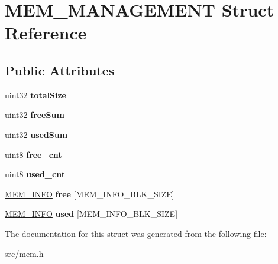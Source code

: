 \hypertarget{struct_m_e_m___m_a_n_a_g_e_m_e_n_t}{}\section{M\+E\+M\+\_\+\+M\+A\+N\+A\+G\+E\+M\+E\+N\+T Struct Reference}
\label{struct_m_e_m___m_a_n_a_g_e_m_e_n_t}
\subsection*{Public Attributes}
\begin{DoxyCompactItemize}
\item 
\hypertarget{struct_m_e_m___m_a_n_a_g_e_m_e_n_t_a66ec16527e43ed4673d4e2b013f88df4}{}uint32 {\bfseries total\+Size}\label{struct_m_e_m___m_a_n_a_g_e_m_e_n_t_a66ec16527e43ed4673d4e2b013f88df4}

\item 
\hypertarget{struct_m_e_m___m_a_n_a_g_e_m_e_n_t_a104979d3a0fb3a659470106638906a16}{}uint32 {\bfseries free\+Sum}\label{struct_m_e_m___m_a_n_a_g_e_m_e_n_t_a104979d3a0fb3a659470106638906a16}

\item 
\hypertarget{struct_m_e_m___m_a_n_a_g_e_m_e_n_t_a2f33be1c99bdc7e5b61cfa56d38f2e67}{}uint32 {\bfseries used\+Sum}\label{struct_m_e_m___m_a_n_a_g_e_m_e_n_t_a2f33be1c99bdc7e5b61cfa56d38f2e67}

\item 
\hypertarget{struct_m_e_m___m_a_n_a_g_e_m_e_n_t_aa566eae98133b99790aaa07ff53e585e}{}uint8 {\bfseries free\+\_\+cnt}\label{struct_m_e_m___m_a_n_a_g_e_m_e_n_t_aa566eae98133b99790aaa07ff53e585e}

\item 
\hypertarget{struct_m_e_m___m_a_n_a_g_e_m_e_n_t_ae230db108b6c530ad148f0536d4ce4f7}{}uint8 {\bfseries used\+\_\+cnt}\label{struct_m_e_m___m_a_n_a_g_e_m_e_n_t_ae230db108b6c530ad148f0536d4ce4f7}

\item 
\hypertarget{struct_m_e_m___m_a_n_a_g_e_m_e_n_t_adff347de1dfe86f91797d8f2d560da82}{}\hyperlink{struct_m_e_m___i_n_f_o}{M\+E\+M\+\_\+\+I\+N\+F\+O} {\bfseries free} \mbox{[}M\+E\+M\+\_\+\+I\+N\+F\+O\+\_\+\+B\+L\+K\+\_\+\+S\+I\+Z\+E\mbox{]}\label{struct_m_e_m___m_a_n_a_g_e_m_e_n_t_adff347de1dfe86f91797d8f2d560da82}

\item 
\hypertarget{struct_m_e_m___m_a_n_a_g_e_m_e_n_t_a41208650756afbdf3c35d31d5f4f5bfe}{}\hyperlink{struct_m_e_m___i_n_f_o}{M\+E\+M\+\_\+\+I\+N\+F\+O} {\bfseries used} \mbox{[}M\+E\+M\+\_\+\+I\+N\+F\+O\+\_\+\+B\+L\+K\+\_\+\+S\+I\+Z\+E\mbox{]}\label{struct_m_e_m___m_a_n_a_g_e_m_e_n_t_a41208650756afbdf3c35d31d5f4f5bfe}

\end{DoxyCompactItemize}


The documentation for this struct was generated from the following file\+:\begin{DoxyCompactItemize}
\item 
src/mem.\+h\end{DoxyCompactItemize}
